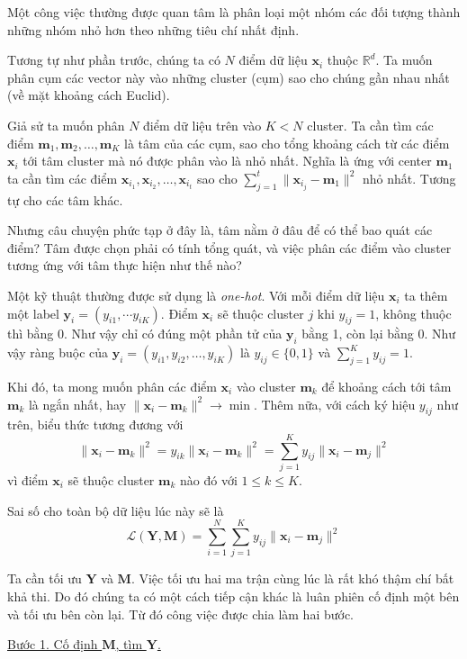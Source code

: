 \documentclass{mynotes}
\newcommand{\RR}{\mathbb{R}}
\begin{document}
Một công việc thường được quan tâm là phân loại một nhóm các đối tượng thành những nhóm nhỏ hơn theo những tiêu chí nhất định.

Tương tự như phần trước, chúng ta có $N$ điểm dữ liệu $\bm{x}_i$ thuộc $\RR^d$. Ta muốn phân cụm các vector này vào những cluster (cụm) sao cho chúng gần nhau nhất (về mặt khoảng cách Euclid).

Giả sử ta muốn phân $N$ điểm dữ liệu trên vào $K < N$ cluster. Ta cần tìm các điểm $\bm{m}_1, \bm{m}_2, \ldots, \bm{m}_K$ là tâm của các cụm, sao cho tổng khoảng cách từ các điểm $\bm{x}_i$ tới tâm cluster mà nó được phân vào là nhỏ nhất. Nghĩa là ứng với center $\bm{m}_1$ ta cần tìm các điểm $\bm{x}_{i_1}, \bm{x}_{i_2}, \ldots, \bm{x}_{i_t}$ sao cho $\sum_{j=1}^t \lVert \bm{x}_{i_j} - \bm{m}_1 \rVert^2$ nhỏ nhất. Tương tự cho các tâm khác.

Nhưng câu chuyện phức tạp ở đây là, tâm nằm ở đâu để có thể bao quát các điểm? Tâm được chọn phải có tính tổng quát, và việc phân các điểm vào cluster tương ứng với tâm thực hiện như thế nào?

Một kỹ thuật thường được sử dụng là \textit{one-hot}. Với mỗi điểm dữ liệu $\bm{x}_i$ ta thêm một label $\bm{y}_i = (y_{i1}, \cdots y_{iK})$. Điểm $\bm{x}_i$ sẽ thuộc cluster $j$ khi $y_{ij} = 1$, không thuộc thì bằng 0. Như vậy chỉ có đúng một phần tử của $\bm{y}_i$ bằng 1, còn lại bằng 0. Như vậy ràng buộc của $\bm{y}_i = (y_{i1}, y_{i2}, \ldots, y_{iK})$ là $y_{ij} \in \{ 0, 1 \}$ và $\sum_{j=1}^K y_{ij} = 1$.

Khi đó, ta mong muốn phân các điểm $\bm{x}_i$ vào cluster $\bm{m}_k$ để khoảng cách tới tâm $\bm{m}_k$ là ngắn nhất, hay $\lVert \bm{x}_i - \bm{m}_k \rVert^2 \to \min$. Thêm nữa, với cách ký hiệu $y_{ij}$ như trên, biểu thức tương đương với \[ \lVert \bm{x}_i - \bm{m}_k \rVert^2 = y_{ik} \lVert \bm{x}_i - \bm{m}_k \rVert^2 = \sum_{j=1}^K y_{ij} \lVert \bm{x}_i - \bm{m}_j \rVert^2 \] vì điểm $\bm{x}_i$ sẽ thuộc cluster $\bm{m}_k$ nào đó với $1 \leq k \leq K$.

Sai số cho toàn bộ dữ liệu lúc này sẽ là \[ \mathcal{L} (\bm{Y}, \bm{M}) = \sum_{i=1}^N \sum_{j=1}^K y_{ij} \lVert \bm{x}_i - \bm{m}_j \rVert^2 \]

Ta cần tối ưu $\bm{Y}$ và $\bm{M}$. Việc tối ưu hai ma trận cùng lúc là rất khó thậm chí bất khả thi. Do đó chúng ta có một cách tiếp cận khác là luân phiên cố định một bên và tối ưu bên còn lại. Từ đó công việc được chia làm hai bước.

\underline{Bước 1. Cố định $\bm{M}$, tìm $\bm{Y}$.}
\end{document}
